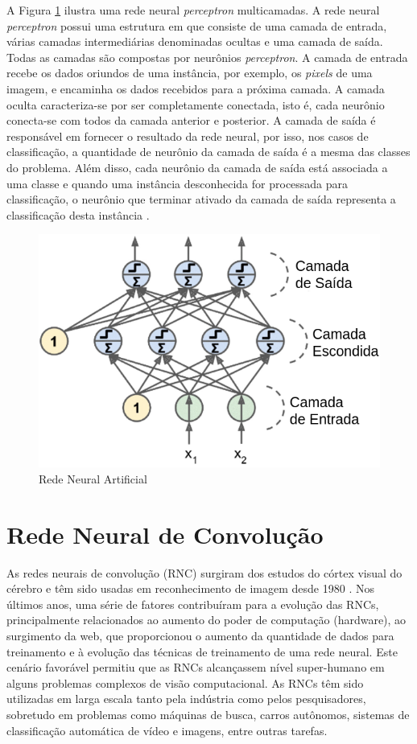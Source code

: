 A Figura \ref{fig:redeneural} ilustra uma rede neural \textit{perceptron} multicamadas.  A rede neural \textit{perceptron} possui uma estrutura em que consiste de uma camada de entrada, várias camadas intermediárias denominadas ocultas e uma camada de saída. Todas as camadas são compostas por neurônios \textit{perceptron}. A camada de entrada recebe os dados oriundos de uma instância, por exemplo, os \textit{pixels} de uma imagem, e encaminha os dados recebidos para a próxima camada. A camada oculta caracteriza-se por ser completamente conectada, isto é, cada neurônio conecta-se com todos da camada anterior e posterior. A camada de saída é responsável em fornecer o resultado da rede neural, por isso, nos casos de classificação, a quantidade de neurônio da camada de saída é a mesma das classes do problema. Além disso, cada neurônio da camada de saída está associada a uma classe e quando uma instância desconhecida for processada para classificação, o neurônio que terminar ativado da camada de saída representa a classificação desta instância \citep{geron2017hands, goodfellow2016deep}.

\begin{figure}
\centering
\includegraphics[scale=0.45]{figuras/redeneural.png}
\caption{Rede Neural Artificial}
\label{fig:redeneural}
\end{figure}

\section{Rede Neural de Convolução}\label{sec:rnc}
As redes neurais de convolução (RNC) surgiram dos estudos do córtex visual do cérebro e têm sido usadas em reconhecimento de imagem desde 1980 \citep{geron2017hands}. Nos últimos anos, uma série de fatores contribuíram para a evolução das RNCs, principalmente relacionados ao aumento do poder de computação (hardware), ao surgimento da web, que proporcionou o aumento da quantidade de dados para treinamento e à evolução das técnicas de treinamento de uma rede neural. Este cenário favorável permitiu que as RNCs alcançassem nível super-humano em alguns problemas complexos de visão computacional. As RNCs têm sido utilizadas em larga escala tanto pela indústria como pelos pesquisadores, sobretudo em problemas como máquinas de busca, carros autônomos, sistemas de classificação automática de vídeo e imagens, entre outras tarefas.


